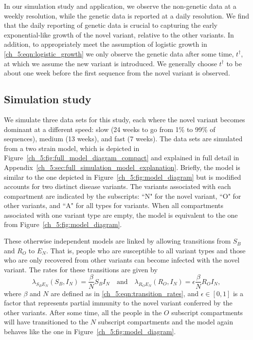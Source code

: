 In our simulation study and application, we observe the non-genetic data at a weekly resolution, while the genetic data is reported at a daily resolution.
We find that the daily reporting of genetic data is crucial to capturing the early exponential-like growth of the novel variant, relative to the other variants.
In addition, to appropriately meet the assumption of logistic growth in \eqref{ch_5:eqn:logistic_growth} we only observe the genetic data after some time, \( t^\dag \), at which we assume the new variant is introduced.
We generally choose \( t^\dag \) to be about one week before the first sequence from the novel variant is observed.

\subsection{Simulation study}
\label{ch_5:subsec:simulation}

We simulate three data sets for this study, each where the novel variant becomes dominant at a different speed: slow (24 weeks to go from 1\% to 99\% of sequences), medium (13 weeks), and fast (7 weeks).
The data sets are simulated from a two strain model, which is depicted in Figure~\ref{ch_5:fig:full_model_diagram_compact} and explained in full detail in Appendix~\ref{ch_5:sec:full_simulation_model_explanation}.
Briefly, the model is similar to the one depicted in Figure~\ref{ch_5:fig:model_diagram} but is modified accounts for two distinct disease variants.
The variants associated with each compartment are indicated by the subscripts: ``N" for the novel variant, ``O" for other variants, and ``A" for all types for variants.
When all compartments associated with one variant type are empty, the model is equivalent to the one from Figure~\ref{ch_5:fig:model_diagram}.

These otherwise independent models are linked by allowing transitions from \( S_B \) and \( R_O \) to \( E_N \).
That is, people who are susceptible to all variant types and those who are only recovered from other variants can become infected with the novel variant.
The rates for these transitions are given by
\begin{equation}
   \lambda_{{S_B}{E_N}}\left( S_B, I_N \right) = \frac{\beta}{N} S_B I_N \quad \textrm{and} \quad \lambda_{{R_O}{E_N}}\left( R_O, I_N \right) = \epsilon \frac{\beta}{N} R_O I_N,
\end{equation}
where \( \beta \) and \( N \) are defined as in \eqref{ch_5:eqn:transition_rates}, and \( \epsilon \in [0, 1] \) is a factor that represents partial immunity to the novel variant conferred by the other variants.
After some time, all the people in the \( O \) subscript compartments will have transitioned to the \( N \) subscript compartments and the model again behaves like the one in Figure~\ref{ch_5:fig:model_diagram}.

